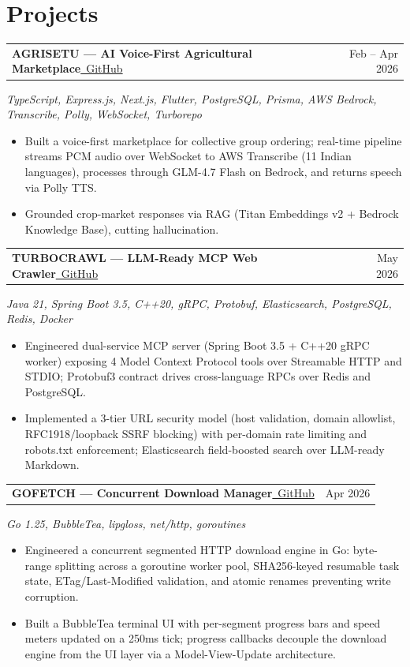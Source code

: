 \documentclass[11pt]{article}
\makeatletter
\newcommand{\projectentry}[4]{%
  \begin{tabular*}{\textwidth}{@{}l@{\extracolsep{\fill}}r@{}}
    \textbf{#1}\enspace#2 & #4 \\
  \end{tabular*}\par\nobreak
  {\itshape #3}\par\vspace{1pt}%
}
\makeatother
\begin{document}
\section{Projects}
\projectentry{AGRISETU --- AI Voice-First Agricultural Marketplace}{\href{https://github.com/taylorreed-dev/agrisetu}{\faGithub\ GitHub}}{TypeScript, Express.js, Next.js, Flutter, PostgreSQL, Prisma, AWS Bedrock, Transcribe, Polly, WebSocket, Turborepo}{Feb -- Apr 2026}
\begin{itemize}
  \item Built a voice-first marketplace for collective group ordering; real-time pipeline streams PCM audio over WebSocket to AWS Transcribe (11 Indian languages), processes through GLM-4.7 Flash on Bedrock, and returns speech via Polly TTS.
  \item Grounded crop-market responses via RAG (Titan Embeddings v2 + Bedrock Knowledge Base), cutting hallucination.
\end{itemize}

\projectentry{TURBOCRAWL --- LLM-Ready MCP Web Crawler}{\href{https://github.com/taylorreed-dev/turbocrawl}{\faGithub\ GitHub}}{Java 21, Spring Boot 3.5, C++20, gRPC, Protobuf, Elasticsearch, PostgreSQL, Redis, Docker}{May 2026}
\begin{itemize}
  \item Engineered dual-service MCP server (Spring Boot 3.5 + C++20 gRPC worker) exposing 4 Model Context Protocol tools over Streamable HTTP and STDIO; Protobuf3 contract drives cross-language RPCs over Redis and PostgreSQL.
  \item Implemented a 3-tier URL security model (host validation, domain allowlist, RFC1918/loopback SSRF blocking) with per-domain rate limiting and robots.txt enforcement; Elasticsearch field-boosted search over LLM-ready Markdown.
\end{itemize}

\projectentry{GOFETCH --- Concurrent Download Manager}{\href{https://github.com/taylorreed-dev/gofetch}{\faGithub\ GitHub}}{Go 1.25, BubbleTea, lipgloss, net/http, goroutines}{Apr 2026}
\begin{itemize}
  \item Engineered a concurrent segmented HTTP download engine in Go: byte-range splitting across a goroutine worker pool, SHA256-keyed resumable task state, ETag/Last-Modified validation, and atomic renames preventing write corruption.
  \item Built a BubbleTea terminal UI with per-segment progress bars and speed meters updated on a 250ms tick; progress callbacks decouple the download engine from the UI layer via a Model-View-Update architecture.
\end{itemize}
\end{document}
